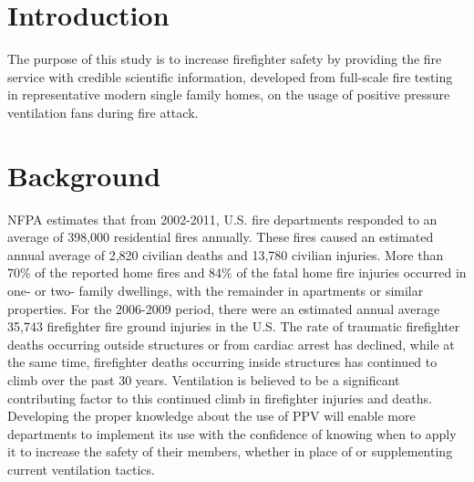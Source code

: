 \documentclass{article}
\begin{document}
\newpage

\tableofcontents

\newpage

\section*{Introduction}
The purpose of this study is to increase firefighter safety by providing the fire service with credible scientific information, developed from full-scale fire testing in representative modern single family homes, on the usage of positive pressure ventilation fans during fire attack. 

\clearpage

\section{Background}
NFPA estimates \cite{NFPAFireLoss} that from 2002-2011, U.S. fire departments responded to an average of 398,000 residential fires annually. These fires caused an estimated annual average of 2,820 civilian deaths and 13,780 civilian injuries. More than 70\% of the reported home fires and 84\% of the fatal home fire injuries occurred in one- or two- family dwellings, with the remainder in apartments or similar properties. For the 2006-2009 period, there were an estimated annual average 35,743 firefighter fire ground injuries in the U.S. \cite{NFPAFFInjuries} The rate of traumatic firefighter deaths occurring outside structures or from cardiac arrest has declined, while at the same time, firefighter deaths occurring inside structures has continued to climb over the past 30 years. \cite{NFPALast30} Ventilation is believed to be a significant contributing factor to this continued climb in firefighter injuries and deaths. Developing the proper knowledge about the use of PPV will enable more departments to implement its use with the confidence of knowing when to apply it to increase the safety of their members, whether in place of or supplementing current ventilation tactics.
\end{document}

